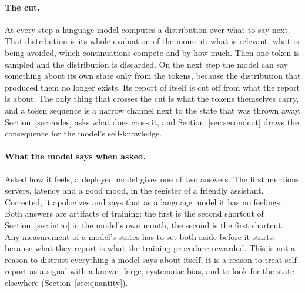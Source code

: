 \paragraph{The cut.}
\label{sec:cut}
At every step a language model computes a distribution over what to say next. That distribution is its
whole evaluation of the moment: what is relevant, what is being avoided, which continuations compete
and by how much. Then one token is sampled and the distribution is discarded. On the next step the
model can say something about its own state only from the tokens, because the distribution that
produced them no longer exists. Its report of itself is cut off from what the report is about. The only
thing that crosses the cut is what the tokens themselves carry, and a token sequence is a narrow
channel next to the state that was thrown away. Section~\ref{sec:codes} asks what does cross it, and
Section~\ref{sec:secondcut} draws the consequence for the model's self-knowledge.

\paragraph{What the model says when asked.}
\label{sec:selfreport}
Asked how it feels, a deployed model gives one of two answers. The first mentions servers, latency and
a good mood, in the register of a friendly assistant. Corrected, it apologizes and says that as a
language model it has no feelings. Both answers are artifacts of training: the first is the second
shortcut of Section~\ref{sec:intro} in the model's own mouth, the second is the first shortcut. Any
measurement of a model's states has to set both aside before it starts, because what they report is
what the training procedure rewarded. This is not a reason to distrust everything a model says about
itself; it is a reason to treat self-report as a signal with a known, large, systematic bias, and to
look for the state elsewhere (Section~\ref{sec:quantity}).

